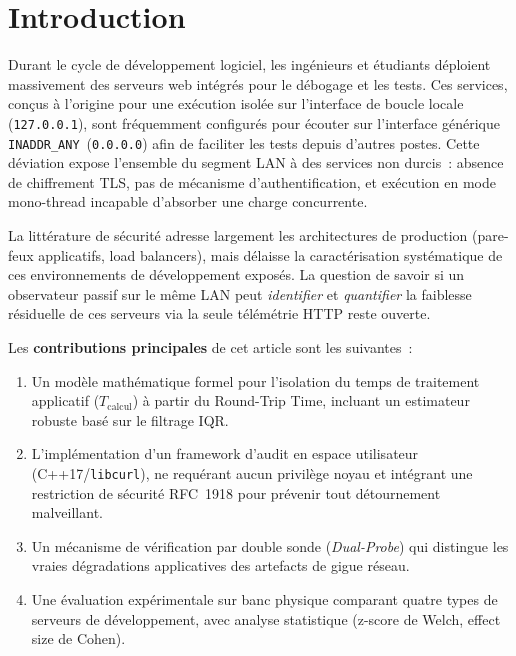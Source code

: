 \documentclass[10pt,conference,compsoc]{IEEEtran}
\begin{document}
\section{Introduction}
\label{sec:introduction}

Durant le cycle de développement logiciel, les ingénieurs et étudiants
déploient massivement des serveurs web intégrés pour le débogage et les
tests. Ces services, conçus à l'origine pour une exécution isolée sur
l'interface de boucle locale (\texttt{127.0.0.1}), sont fréquemment
configurés pour écouter sur l'interface générique
\texttt{INADDR\_ANY}~(\texttt{0.0.0.0}) afin de faciliter les tests
depuis d'autres postes. Cette déviation expose l'ensemble du segment
LAN à des services non durcis~: absence de chiffrement TLS, pas de
mécanisme d'authentification, et exécution en mode mono-thread incapable
d'absorber une charge concurrente.

La littérature de sécurité adresse largement les architectures de
production (pare-feux applicatifs, load balancers), mais délaisse la
caractérisation systématique de ces environnements de développement
exposés. La question de savoir si un observateur passif sur le même
LAN peut \textit{identifier} et \textit{quantifier} la faiblesse
résiduelle de ces serveurs via la seule télémétrie HTTP reste ouverte.

Les \textbf{contributions principales} de cet article sont les suivantes~:
\begin{enumerate}
\item Un modèle mathématique formel pour l'isolation du temps de
  traitement applicatif ($T_{\mathrm{calcul}}$) à partir du Round-Trip
  Time, incluant un estimateur robuste basé sur le filtrage IQR.
\item L'implémentation d'un framework d'audit en espace utilisateur
  (C++17/\texttt{libcurl}), ne requérant aucun privilège noyau et
  intégrant une restriction de sécurité RFC~1918 pour prévenir tout
  détournement malveillant.
\item Un mécanisme de vérification par double sonde
  (\textit{Dual-Probe}) qui distingue les vraies dégradations
  applicatives des artefacts de gigue réseau.
\item Une évaluation expérimentale sur banc physique comparant quatre
  types de serveurs de développement, avec analyse statistique
  (z-score de Welch, effect size de Cohen).
\end{enumerate}
\end{document}
